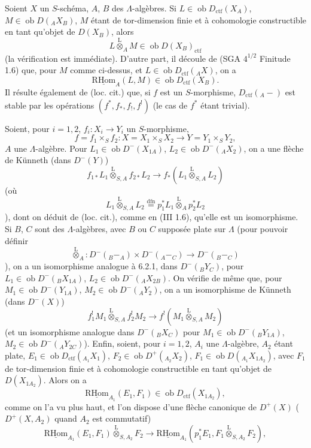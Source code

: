 \documentclass[11pt]{article}
\newcommand{\R}{\mathrm{R}}\newcommand{\RHomCore}{\mathrm{RHom}}
\providecommand{\RHom}{\RHomCore}
\providecommand{\uRHom}{\underline{\RHom}}
\providecommand{\lten}{\overset{\mathrm L}{\otimes}}
\providecommand{\Ob}{\operatorname{ob}}
\providecommand{\RHom}{\RHomCore}
\providecommand{\lten}{\overset{\mathrm L}{\otimes}}
\providecommand{\RHom}{\R\mathcal{H}om}
\providecommand{\lten}{\overset{\mathrm L}{\otimes}}
\providecommand{\Ob}{\operatorname{ob}}
\providecommand{\R}{\mathrm R}
\providecommand{\lten}{\overset{\mathrm L}{\otimes}}
\providecommand{\lten}{\overset{\mathrm L}{\otimes}}
\providecommand{\Ob}{\operatorname{Ob}}
\providecommand{\lten}{\overset{\mathrm L}{\otimes}}
\providecommand{\RHom}{\RHomCore}
\providecommand{\Ob}{\operatorname{ob}}
\providecommand{\Ob}{\operatorname{Ob}}
\providecommand{\lten}{\overset{\mathrm L}{\otimes}}
\begin{document}
Soient $X$ un $S$-schéma, $A$, $B$ des $\Lambda$-algèbres. Si $L\in\Ob D_{\mathrm{ctf}}(X_A)$, $M\in\Ob D({}_AX_B)$, $M$ étant de tor-dimension finie et à cohomologie constructible en tant qu'objet de $D(X_B)$, alors
\[
L\lten_A M\in\Ob D(X_B)_{\mathrm{ctf}}
\]
(la vérification est immédiate). D'autre part, il découle de (SGA $4^{1/2}$ Finitude 1.6) que, pour $M$ comme ci-dessus, et $L\in\Ob D_{\mathrm{ctf}}({}_AX)$, on a
\[
\uRHom_A(L,M)\in\Ob D_{\mathrm{ctf}}(X_B).
\]
Il résulte également de (loc. cit.) que, si $f$ est un $S$-morphisme, $D_{\mathrm{ctf}}({}_A-)$ est stable par les opérations $(f^*,f_*,f_!,f^!)$ (le cas de $f^*$ étant trivial).

Soient, pour $i=1,2$, $f_i:X_i\to Y_i$ un $S$-morphisme,
\[
f=f_1\times_S f_2:X=X_1\times_SX_2\longrightarrow Y=Y_1\times_SY_2,
\]
$A$ une $\Lambda$-algèbre.
Pour $L_1\in\Ob D^-(X_{1A})$, $L_2\in\Ob D^-({}_AX_2)$, on a une flèche de Künneth (dans $D^-(Y)$)
\begin{equation}
f_{1*}L_1\lten_{S,A}f_{2*}L_2
\longrightarrow
f_*(L_1\lten_{S,A}L_2)
\tag{6.2.1}
\end{equation}
(où
\[
L_1\lten_{S,A}L_2
\stackrel{\mathrm{dfn}}{=}p_1^*L_1\lten_Ap_2^*L_2
\]),
dont on déduit de (loc. cit.), comme en (III 1.6), qu'elle est un isomorphisme. Si $B$, $C$ sont des $\Lambda$-algèbres, avec $B$ ou $C$ supposée plate sur $\Lambda$ (pour pouvoir définir
\[
\lten_A:D^-({}_B{-}_A)\times D^-({}_A{-}_C)\longrightarrow D^-({}_B{-}_C)
\]),
on a un isomorphisme analogue à 6.2.1, dans $D^-({}_BY_C)$, pour $L_1\in\Ob D^-({}_BX_{1A})$, $L_2\in\Ob D^-({}_AX_{2B})$. On vérifie de même que, pour $M_1\in\Ob D^-(Y_{1A})$, $M_2\in\Ob D^-({}_AY_2)$, on a un isomorphisme de Künneth (dans $D^-(X)$)
\begin{equation}
f_1^!M_1\lten_{S,A}f_2^!M_2
\longrightarrow
f^!(M_1\lten_{S,A}M_2)
\tag{6.2.2}
\end{equation}
(et un isomorphisme analogue dans $D^-({}_B X_C)$ pour $M_1\in\Ob D^-({}_BY_{1A})$, $M_2\in\Ob D^-({}_AY_{2C})$). Enfin, soient, pour $i=1,2$, $A_i$ une $\Lambda$-algèbre, $A_2$ étant plate, $E_1\in\Ob D_{\mathrm{ctf}}({}_{A_1}X_1)$, $F_2\in\Ob D^+({}_{A_2}X_2)$, $F_1\in\Ob D({}_{A_1}X_{1A_2})$, avec $F_1$ de tor-dimension finie et à cohomologie constructible en tant qu'objet de $D(X_{1A_2})$. Alors on a
\[
\uRHom_{A_1}(E_1,F_1)\in\Ob D_{\mathrm{ctf}}(X_{1A_2}),
\]
comme on l'a vu plus haut, et l'on dispose d'une flèche canonique de $D^+(X)$ ($D^+(X,A_2)$ quand $A_2$ est commutatif)
\begin{equation}
\uRHom_{A_1}(E_1,F_1)\lten_{S,A_2}F_2
\longrightarrow
\uRHom_{A_1}(p_1^*E_1,F_1\lten_{S,A_2}F_2),
\tag{6.2.3}
\end{equation}
\end{document}
